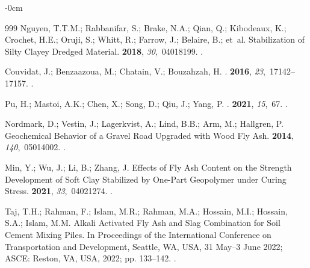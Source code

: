 \documentclass[sustainability,article,accept,pdftex,moreauthors]{Definitions/mdpi}
\begin{document}
{{\begin{adjustwidth}{-\extralength}{0cm}
\begin{thebibliography}{999}
Nguyen, T.T.M.; Rabbanifar, S.; Brake, N.A.; Qian, Q.; Kibodeaux, K.; Crochet,
  H.E.; Oruji, S.; Whitt, R.; Farrow, J.; Belaire, B.;  et~al.
\newblock Stabilization of Silty Clayey Dredged Material.
 {\bf 2018}, {\em
  30},~04018199.
.

Couvidat, J.; Benzaazoua, M.; Chatain, V.; Bouzahzah, H.
.
 {\bf 2016}, {\em
  23},~17142--17157.
.

Pu, H.; Mastoi, A.K.; Chen, X.; Song, D.; Qiu, J.; Yang, P.
.
 {\bf 2021},
  {\em 15},~67.
.

Nordmark, D.; Vestin, J.; Lagerkvist, A.; Lind, B.B.; Arm, M.; Hallgren, P.
\newblock Geochemical Behavior of a Gravel Road Upgraded with Wood Fly Ash.
 {\bf 2014}, {\em
  140},~05014002.
.

Min, Y.; Wu, J.; Li, B.; Zhang, J.
\newblock Effects of Fly Ash Content on the Strength Development of Soft Clay
  Stabilized by One-Part Geopolymer under Curing Stress.
 {\bf 2021}, {\em
  33},~04021274.
.

Taj, T.H.; Rahman, F.; Islam, M.R.; Rahman, M.A.; Hossain, M.I.; Hossain, S.A.;
  Islam, M.M. Alkali Activated Fly Ash and Slag Combination for Soil Cement
  Mixing Piles.
\newblock In Proceedings of the International Conference on Transportation and Development, Seattle, WA, USA, 31 May--3 June 2022; ASCE: Reston, VA, USA, 2022; pp. 133--142.
.


\end{thebibliography}
\end{adjustwidth}}}
\end{document}
